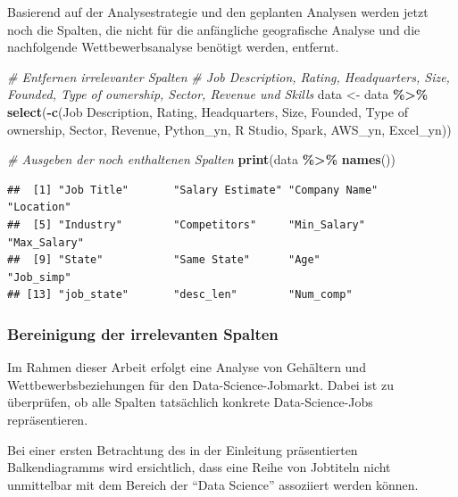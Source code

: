 \documentclass[
]{article}
\newenvironment{Shaded}{\begin{snugshade}}{\end{snugshade}}
\newcommand{\AttributeTok}[1]{\textcolor[rgb]{0.13,0.29,0.53}{#1}}
\newcommand{\CommentTok}[1]{\textcolor[rgb]{0.56,0.35,0.01}{\textit{#1}}}
\newcommand{\FunctionTok}[1]{\textcolor[rgb]{0.13,0.29,0.53}{\textbf{#1}}}
\newcommand{\NormalTok}[1]{#1}
\newcommand{\OtherTok}[1]{\textcolor[rgb]{0.56,0.35,0.01}{#1}}
\newcommand{\SpecialCharTok}[1]{\textcolor[rgb]{0.81,0.36,0.00}{\textbf{#1}}}
\newcommand{\StringTok}[1]{\textcolor[rgb]{0.31,0.60,0.02}{#1}}
\begin{document}
Basierend auf der Analysestrategie und den geplanten Analysen werden
jetzt noch die Spalten, die nicht für die anfängliche geografische
Analyse und die nachfolgende Wettbewerbsanalyse benötigt werden,
entfernt.

\begin{Shaded}
\begin{Highlighting}[]
\CommentTok{\# Entfernen irrelevanter Spalten}
\CommentTok{\# Job Description, Rating, Headquarters, Size, Founded, Type of ownership, Sector, Revenue und Skills}
\NormalTok{data }\OtherTok{\textless{}{-}}\NormalTok{ data }\SpecialCharTok{\%\textgreater{}\%}
  \FunctionTok{select}\NormalTok{(}\SpecialCharTok{{-}}\FunctionTok{c}\NormalTok{(}\StringTok{\textasciigrave{}}\AttributeTok{Job Description}\StringTok{\textasciigrave{}}\NormalTok{, Rating, Headquarters, Size, Founded,}
            \StringTok{\textasciigrave{}}\AttributeTok{Type of ownership}\StringTok{\textasciigrave{}}\NormalTok{, Sector, Revenue,}
\NormalTok{            Python\_yn, }\StringTok{\textasciigrave{}}\AttributeTok{R Studio}\StringTok{\textasciigrave{}}\NormalTok{, Spark, AWS\_yn, Excel\_yn))}

\CommentTok{\# Ausgeben der noch enthaltenen Spalten}
\FunctionTok{print}\NormalTok{(data }\SpecialCharTok{\%\textgreater{}\%} \FunctionTok{names}\NormalTok{())}
\end{Highlighting}
\end{Shaded}

\begin{verbatim}
##  [1] "Job Title"       "Salary Estimate" "Company Name"    "Location"       
##  [5] "Industry"        "Competitors"     "Min_Salary"      "Max_Salary"     
##  [9] "State"           "Same State"      "Age"             "Job_simp"       
## [13] "job_state"       "desc_len"        "Num_comp"
\end{verbatim}

\subsubsection{Bereinigung der irrelevanten
Spalten}\label{bereinigung-der-irrelevanten-spalten}

Im Rahmen dieser Arbeit erfolgt eine Analyse von Gehältern und
Wettbewerbsbeziehungen für den Data-Science-Jobmarkt. Dabei ist zu
überprüfen, ob alle Spalten tatsächlich konkrete Data-Science-Jobs
repräsentieren.

Bei einer ersten Betrachtung des in der Einleitung präsentierten
Balkendiagramms wird ersichtlich, dass eine Reihe von Jobtiteln nicht
unmittelbar mit dem Bereich der ``Data Science'' assoziiert werden
können.
\end{document}
